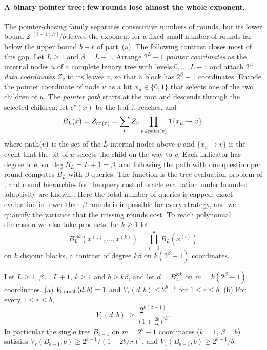 \paragraph{A binary pointer tree: few rounds lose almost the whole exponent.}
The pointer-chasing family separates consecutive numbers of rounds, but its
lower bound $2^{\lfloor(b-1)/r\rfloor}/b$ leaves the exponent for a fixed
small number of rounds far below the upper bound $b-r$ of part~(a). The
following contrast closes most of this gap. Let $L\ge1$ and $\beta=L+1$.
Arrange $2^L-1$ \emph{pointer coordinates} as the internal nodes $u$ of a
complete binary tree with levels $0,\ldots,L-1$ and attach $2^L$ \emph{data
coordinates} $Z_v$ to its leaves $v$, so that a block has $2^{\beta}-1$
coordinates. Encode the pointer coordinate of node $u$ as a bit
$x_u\in\{0,1\}$ that selects one of the two children of $u$. The
\emph{pointer path} starts at the root and descends through the selected
children; let $c^\star(x)$ be the leaf it reaches, and
\[
 B_L(x)=Z_{c^\star(x)}=\sum_{v}Z_v\prod_{u\in{\rm path}(v)}\mathbf 1\{x_u\to v\},
\]
where ${\rm path}(v)$ is the set of the $L$ internal nodes above $v$ and
$\{x_u\to v\}$ is the event that the bit of $u$ selects the child on the way
to $v$. Each indicator has degree one, so $\deg B_L=L+1=\beta$, and following
the path with one question per round computes $B_L$ with $\beta$ queries. The
function is the tree evaluation problem of \citet{cook2012}, and round
hierarchies for the query cost of oracle evaluation under bounded adaptivity
are known \citep{canonne2018,li2026regex}. Here the total number of queries is capped, exact
evaluation in fewer than $\beta$ rounds is impossible for every strategy, and
we quantify the variance that the missing rounds cost. To reach polynomial
dimension we also take products: for $k\ge1$ let
\[
 B_L^{\otimes k}(x^{(1)},\ldots,x^{(k)})=\prod_{i=1}^kB_L(x^{(i)})
\]
on $k$ disjoint blocks, a contrast of degree $k\beta$ on $k(2^\beta-1)$
coordinates.

\begin{theorem}\label{thm:binarytree}
Let $L\ge1$, $\beta=L+1$, $k\ge1$ and $b\ge k\beta$, and let
$d=B_L^{\otimes k}$ on $m=k(2^\beta-1)$ coordinates.
\textup{(a)} $V_{\rm branch}(d,b)=1$ and $V_r(d,b)\le2^{b-r}$ for
$1\le r\le b$.
\textup{(b)} For every $1\le r\le b$,
\[
 V_r(d,b)\ \ge\ \frac{2^{k(\beta-1)}}{\big(1+\tfrac{2b}{rk}\big)^{rk}} .
\]
In particular the single tree $B_{b-1}$ on $m=2^b-1$ coordinates ($k=1$,
$\beta=b$) satisfies $V_r(B_{b-1},b)\ge2^{b-1}/(1+2b/r)^r$, and
$V_1(B_{b-1},b)\ge2^{b-1}/b$.
\end{theorem}

